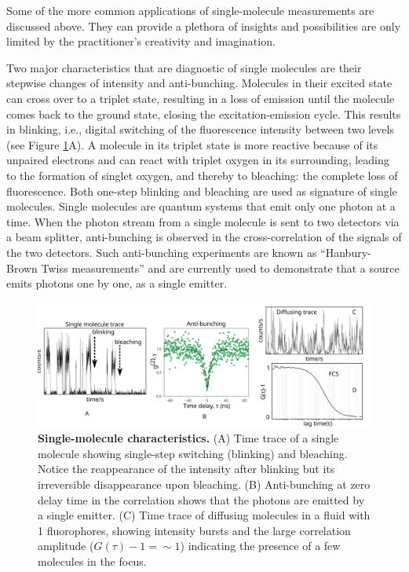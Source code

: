 Some of the more common applications of single-molecule measurements are discussed above. They can provide a plethora of insights and possibilities are only limited by the practitioner's creativity and imagination.

Two major characteristics that are diagnostic of single molecules are their stepwise changes of intensity and anti-bunching.\cite{rasnik2006nonblinking,basch1992photon}
Molecules in their excited state can cross over to a triplet state, resulting in a loss of emission until the molecule comes back to the ground state, closing the excitation-emission cycle.
This results in blinking, i.e., digital switching of the fluorescence intensity between two levels (see Figure \ref{fig:SM_characteristics}A).
A molecule in its triplet state is more reactive because of its unpaired electrons and can react with triplet oxygen in its surrounding, leading to the formation of singlet oxygen, and thereby to bleaching: the complete loss of fluorescence.
Both one-step blinking and bleaching are used as signature of single molecules.
Single molecules are quantum systems that emit only one photon at a time. When the photon stream from a single molecule is sent to two detectors via a beam splitter, anti-bunching is observed in the cross-correlation of the signals of the two detectors.
Such anti-bunching experiments are known as ``Hanbury-Brown Twiss  measurements'' and are currently used to demonstrate that a source emits photons one by one, as a single emitter.\cite{brown1956correlation}
\begin{figure}
	\centering
	\includegraphics[width=\textwidth]{SM_characteristics}
	\caption{\textbf{Single-molecule characteristics.}
	(A) Time trace of a single molecule showing single-step switching (blinking) and bleaching.
	Notice the reappearance of the intensity after blinking but its irreversible disappearance upon bleaching.
	(B) Anti-bunching at zero delay time in the correlation shows that the photons are emitted by a single emitter.\cite{chu2016a}
	(C) Time trace of diffusing molecules in a fluid with \SI{1}{\nM} fluorophores, showing intensity bursts and the large correlation amplitude ($G(\tau)-1={\sim}1$) indicating the presence of a few molecules in the focus.}
	\label{fig:SM_characteristics}
\end{figure}

